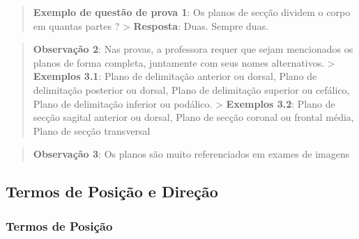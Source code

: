 \documentclass[
]{book}
\begin{document}
\begin{quote}
\textbf{Exemplo de questão de prova 1}: Os planos de secção dividem o corpo em quantas partes ?
\textgreater{} \textbf{Resposta}: Duas. Sempre duas.
\end{quote}

\begin{quote}
\textbf{Observação 2}: Nas provas, a professora requer que sejam mencionados os planos de forma completa, juntamente com seus nomes alternativos.
\textgreater{} \textbf{Exemplos 3.1}: Plano de delimitação anterior ou dorsal, Plano de delimitação posterior ou dorsal, Plano de delimitação superior ou cefálico, Plano de delimitação inferior ou podálico.
\textgreater{} \textbf{Exemplos 3.2}: Plano de secção sagital anterior ou dorsal, Plano de secção coronal ou frontal média, Plano de secção transversal
\end{quote}

\begin{quote}
\textbf{Observação 3}: Os planos são muito referenciados em exames de imagens
\end{quote}

\hypertarget{termos-de-posiuxe7uxe3o-e-direuxe7uxe3o}{%
\subsection{Termos de Posição e Direção}\label{termos-de-posiuxe7uxe3o-e-direuxe7uxe3o}}

\hypertarget{termos-de-posiuxe7uxe3o}{%
\subsubsection{Termos de Posição}\label{termos-de-posiuxe7uxe3o}}
\end{document}
